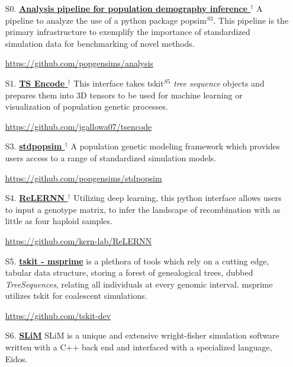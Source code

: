\documentclass[letterpaper,11pt]{article}
\let\oldhref\href
\renewcommand{\href}[2]{\oldhref{#1}{\bfseries#2}}
\begin{document}
\begin{enumerate}

\item [S0.] \href{https://github.com/popgensims/analysis/tree/master/n_t}{Analysis pipeline for population demography inference $^{\dagger}$} \space \space
        A pipeline to analyze the use of a python package popsim$^{S3}$. 
        This pipeline is the primary infrastructure to exemplify the importance of standardized simulation 
        data for benchmarking of novel methods.
        
        \space \url{https://github.com/popgensims/analysis}

\item [S1.] \href{https://github.com/jgallowa07/tsencode}{TS Encode $^{\dagger}$} \space \space
        This interface takes tskit$^{S5}$ \textit{tree sequence} objects 
        and prepares them into 3D tensors to be used for machine learning or
        visualization of population genetic processes. 
        
        \space \url{https://github.com/jgallowa07/tsencode}

\item [S3.] \href{https://github.com/popgensims/stdpopsim}{stdpopsim $^{\dagger}$} \space \space
        A population genetic modeling framework which provides
        users access to a range of standardized simulation models. 
        
        \space \url{https://github.com/popgensims/stdpopsim}

\item [S4.] \href{https://github.com/kern-lab/ReLERNN}{ReLERNN $^{\dagger}$} \space \space
        Utilizing deep learning, this python interface allows users to input a genotype matrix, 
        to infer the landscape of recombination with as little as four haploid samples. 

        \space \url{https://github.com/kern-lab/ReLERNN}

\item [S5.] \href{https://github.com/tskit-dev}{tskit - msprime} \space \space
         is a plethora of tools which rely on a cutting edge, tabular data structure, 
        storing a forest of genealogical trees, dubbed \textit{TreeSequences}, relating all individuals at every genomic interval. 
        msprime utilizes tskit for coalescent simulations.
        
        \space \url{https://github.com/tskit-dev}

\item [S6.] \href{https://messerlab.org/slim/}{SLiM} \space \space
        SLiM is a unique and extensive wright-fisher simulation software written with a C++ back end and 
        interfaced with a specialized language, Eidos.
        

\end{enumerate}
\end{document}
